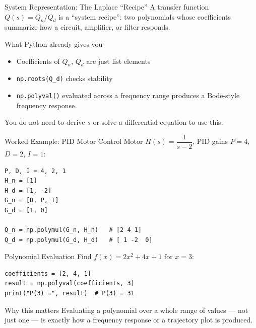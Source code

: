 \documentclass[9pt,aspectratio=169,xcolor=table]{beamer}
\begin{document}
\begin{frame}{System Representation: The Laplace ``Recipe''}
    \leavevmode
    \small
    A \alert{transfer function} $Q(s) = Q_n/Q_d$ is a ``system
    recipe'': two polynomials whose coefficients summarize how a
    circuit, amplifier, or filter responds.

    \vspace{2mm}
    \begin{block}{What Python already gives you}
        \begin{itemize}
            \item Coefficients of $Q_n$, $Q_d$ are just list elements
            \item \texttt{np.roots(Q\_d)} checks \alert{stability}
            \item \texttt{np.polyval()} evaluated across a frequency
                  range produces a \alert{Bode-style} frequency
                  response
        \end{itemize}
    \end{block}

    \vspace{2mm}
    {\scriptsize You do not need to derive $s$ or solve a differential
    equation to use this.}
\end{frame}

\begin{frame}[fragile]{Worked Example: PID Motor Control}
    \leavevmode
    \small
    Motor $H(s) = \dfrac{1}{s-2}$, PID gains $P=4$, $D=2$, $I=1$:

\begin{lstlisting}
P, D, I = 4, 2, 1
H_n = [1]
H_d = [1, -2]
G_n = [D, P, I]
G_d = [1, 0]

Q_n = np.polymul(G_n, H_n)   # [2 4 1]
Q_d = np.polymul(G_d, H_d)   # [ 1 -2  0]
\end{lstlisting}
\end{frame}

\begin{frame}[fragile]{Polynomial Evaluation}
    \leavevmode
    Find $f(x) = 2x^2 + 4x + 1$ for $x = 3$:

\begin{lstlisting}
coefficients = [2, 4, 1]
result = np.polyval(coefficients, 3)
print("P(3) =", result)  # P(3) = 31
\end{lstlisting}

    \vspace{3mm}
    \begin{block}{Why this matters}
        Evaluating a polynomial over a whole \alert{range} of values
        --- not just one --- is exactly how a frequency response or a
        trajectory plot is produced.
    \end{block}
\end{frame}
\end{document}
